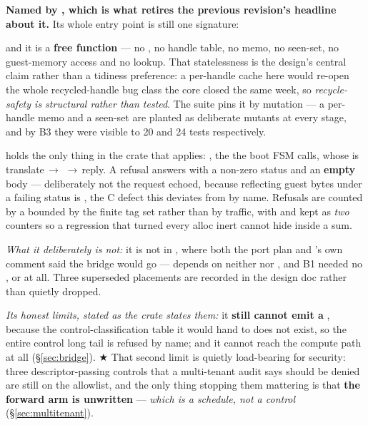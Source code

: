 \documentclass[10.5pt]{article}
\begin{document}
\textbf{Named by , which is what retires the previous
revision's headline about it.} Its whole entry point is still one signature:

\begin{center}\small
{}
\end{center}

\noindent
and it is a \textbf{free function} — no , no handle table, no memo, no seen-set,
no guest-memory access and no lookup. That statelessness is the design's central claim rather than
a tidiness preference: a per-handle cache here would re-open the whole recycled-handle bug class
the core closed the same week, so \emph{recycle-safety is structural rather than tested}. The
suite pins it by mutation — a per-handle memo and a seen-set are planted as deliberate mutants
at every stage, and by B3 they were visible to 20 and 24 tests respectively.

 holds the only thing in the crate that applies: , the
 the boot FSM calls, whose  is
translate\,$\rightarrow$\,\,$\rightarrow$\,reply. A refusal answers with a
non-zero status and an \textbf{empty} body — deliberately not the request echoed, because
reflecting guest bytes under a failing status is , the C defect
this deviates from by name. Refusals are counted by a  bounded by the finite
tag set rather than by traffic, with  and  kept as \emph{two}
counters so a regression that turned every alloc inert cannot hide inside a sum.

\emph{What it deliberately is not:} it is not in , where both the port plan and
's own comment said the bridge would go —  depends on neither 
nor , and B1 needed no ,  or  at all. Three
superseded placements are recorded in the design doc rather than quietly dropped.

\emph{Its honest limits, stated as the crate states them:} it \textbf{still cannot emit a
}, because the control-classification table it would hand to does not
exist, so the entire control long tail is refused by name; and it cannot reach the compute path
at all (\S\ref{sec:bridge}). ★ That second limit is quietly load-bearing for security: three
descriptor-passing controls that a multi-tenant audit says should be denied are still on the
allowlist, and the only thing stopping them mattering is that \textbf{the forward arm is
unwritten} — \emph{which is a schedule, not a control} (\S\ref{sec:multitenant}).
\end{document}
